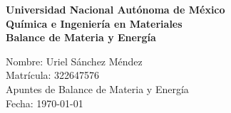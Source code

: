 \documentclass[12pt]{article}
\begin{document}
\begin{titlepage}
\thispagestyle{empty}
\begin{center}
\vspace*{2cm}
\fontsize{14}{30}\selectfont\textbf{Universidad Nacional Autónoma de México} \\
\vspace{1cm}
\fontsize{14}{30}\selectfont\textbf{Química e Ingeniería en Materiales} \\
\vspace{1cm}
\fontsize{14}{30}\selectfont\textbf{Balance de Materia y Energía} \\
\end{center}
\vspace{2cm}
\begin{flushright}
    \fontsize{14}{30}\selectfont
        \hspace{2cm} Nombre: Uriel Sánchez Méndez \\
        \hspace{2cm} Matrícula: 322647576 \\
        \hspace{2cm} Apuntes de Balance de Materia y Energía \\
        \hspace{2cm} Fecha: \today \\
\end{flushright}
\end{titlepage}

\tableofcontents
\thispagestyle{empty}
\newpage



\end{document}
